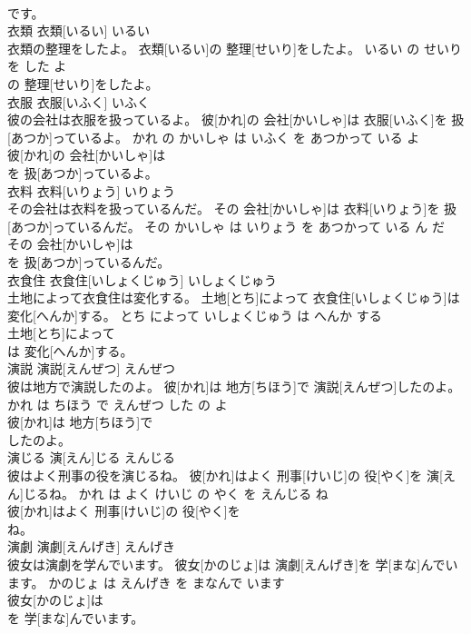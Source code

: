 \documentclass[8pt]{extreport}
\begin{document}
\begin{CJK}{UTF8}{min}
\\	です。			
\\	衣類	衣類[いるい]	いるい	
\\	衣類の整理をしたよ。	衣類[いるい]の 整理[せいり]をしたよ。	いるい の せいり を した よ	
\\	の 整理[せいり]をしたよ。			
\\	衣服	衣服[いふく]	いふく	
\\	彼の会社は衣服を扱っているよ。	彼[かれ]の 会社[かいしゃ]は 衣服[いふく]を 扱[あつか]っているよ。	かれ の かいしゃ は いふく を あつかって いる よ	
\\	彼[かれ]の 会社[かいしゃ]は
\\	を 扱[あつか]っているよ。			
\\	衣料	衣料[いりょう]	いりょう	
\\	その会社は衣料を扱っているんだ。	その 会社[かいしゃ]は 衣料[いりょう]を 扱[あつか]っているんだ。	その かいしゃ は いりょう を あつかって いる ん だ	
\\	その 会社[かいしゃ]は
\\	を 扱[あつか]っているんだ。			
\\	衣食住	衣食住[いしょくじゅう]	いしょくじゅう	
\\	土地によって衣食住は変化する。	土地[とち]によって 衣食住[いしょくじゅう]は 変化[へんか]する。	とち によって いしょくじゅう は へんか する	
\\	土地[とち]によって
\\	は 変化[へんか]する。			
\\	演説	演説[えんぜつ]	えんぜつ	
\\	彼は地方で演説したのよ。	彼[かれ]は 地方[ちほう]で 演説[えんぜつ]したのよ。	かれ は ちほう で えんぜつ した の よ	
\\	彼[かれ]は 地方[ちほう]で
\\	したのよ。			
\\	演じる	演[えん]じる	えんじる	
\\	彼はよく刑事の役を演じるね。	彼[かれ]はよく 刑事[けいじ]の 役[やく]を 演[えん]じるね。	かれ は よく けいじ の やく を えんじる ね	
\\	彼[かれ]はよく 刑事[けいじ]の 役[やく]を
\\	ね。			
\\	演劇	演劇[えんげき]	えんげき	
\\	彼女は演劇を学んでいます。	彼女[かのじょ]は 演劇[えんげき]を 学[まな]んでいます。	かのじょ は えんげき を まなんで います	
\\	彼女[かのじょ]は
\\	を 学[まな]んでいます。			

\end{CJK}
\end{document}
